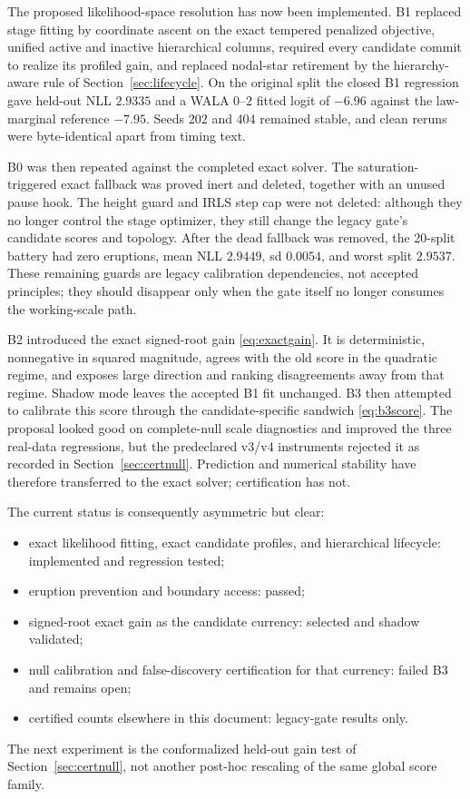 \documentclass[11pt]{article}
\begin{document}
The proposed likelihood-space resolution has now been implemented. B1 replaced stage fitting by
coordinate ascent on the exact tempered penalized objective, unified active and inactive hierarchical
columns, required every candidate commit to realize its profiled gain, and replaced nodal-star
retirement by the hierarchy-aware rule of Section~\ref{sec:lifecycle}. On the original split the
closed B1 regression gave held-out NLL $2.9335$ and a WALA $0$--$2$ fitted logit of $-6.96$ against
the law-marginal reference $-7.95$. Seeds 202 and 404 remained stable, and clean reruns were
byte-identical apart from timing text.

B0 was then repeated against the completed exact solver. The saturation-triggered exact fallback was
proved inert and deleted, together with an unused pause hook. The height guard and IRLS step cap were
not deleted: although they no longer control the stage optimizer, they still change the legacy gate's
candidate scores and topology. After the dead fallback was removed, the 20-split battery had zero
eruptions, mean NLL $2.9449$, sd $0.0054$, and worst split $2.9537$. These remaining guards are
legacy calibration dependencies, not accepted principles; they should disappear only when the gate
itself no longer consumes the working-scale path.

B2 introduced the exact signed-root gain \eqref{eq:exactgain}. It is deterministic, nonnegative in
squared magnitude, agrees with the old score in the quadratic regime, and exposes large direction and
ranking disagreements away from that regime. Shadow mode leaves the accepted B1 fit unchanged. B3
then attempted to calibrate this score through the candidate-specific sandwich
\eqref{eq:b3score}. The proposal looked good on complete-null scale diagnostics and improved the
three real-data regressions, but the predeclared v3/v4 instruments rejected it as recorded in
Section~\ref{sec:certnull}. Prediction and numerical stability have therefore transferred to the
exact solver; certification has not.

The current status is consequently asymmetric but clear:
\begin{itemize}[leftmargin=2em,itemsep=1pt]
\item exact likelihood fitting, exact candidate profiles, and hierarchical lifecycle: implemented and
regression tested;
\item eruption prevention and boundary access: passed;
\item signed-root exact gain as the candidate currency: selected and shadow validated;
\item null calibration and false-discovery certification for that currency: failed B3 and remains open;
\item certified counts elsewhere in this document: legacy-gate results only.
\end{itemize}
The next experiment is the conformalized held-out gain test of
Section~\ref{sec:certnull}, not another post-hoc rescaling of the same global score family.
\end{document}
